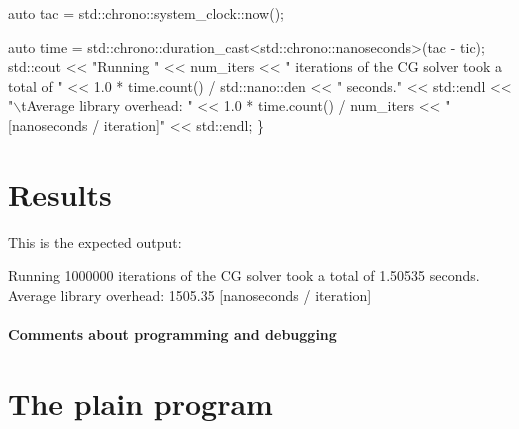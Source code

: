 \begin{DoxyCode}
    \textcolor{keyword}{auto} tac = std::chrono::system\_clock::now();

    \textcolor{keyword}{auto} time = std::chrono::duration\_cast<std::chrono::nanoseconds>(tac - tic);
    std::cout << \textcolor{stringliteral}{"Running "} << num\_iters
              << \textcolor{stringliteral}{" iterations of the CG solver took a total of "}
              << 1.0 * time.count() / std::nano::den << \textcolor{stringliteral}{" seconds."} << std::endl
              << \textcolor{stringliteral}{"\(\backslash\)tAverage library overhead:     "}
              << 1.0 * time.count() / num\_iters << \textcolor{stringliteral}{" [nanoseconds / iteration]"}
              << std::endl;
\}
\end{DoxyCode}
 \label{_Results}%
\section*{Results}

This is the expected output\+:


\begin{DoxyCode}
Running 1000000 iterations of the CG solver took a total of 1.50535 seconds.
        Average library overhead:     1505.35 [nanoseconds / iteration]
\end{DoxyCode}


\label{_Commentsaboutprogramminganddebugging}%
\paragraph*{Comments about programming and debugging }

\label{_PlainProg}%
 \section*{The plain program}


